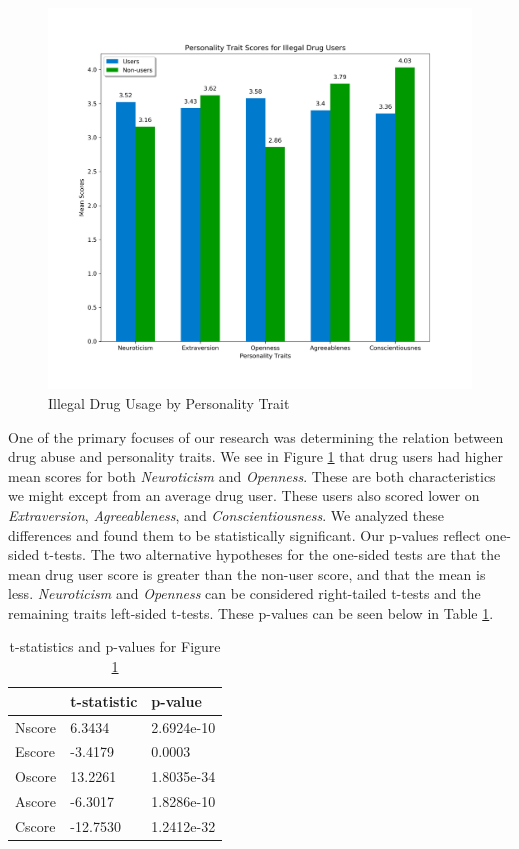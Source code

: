 \documentclass[10pt]{article}
\begin{document}
\begin{figure}[H]
\caption{Illegal Drug Usage by Personality Trait}
\label{fig:traits}
\centering
\includegraphics[scale=0.22]{traits.png}
\end{figure}

One of the primary focuses of our research was determining the relation between drug abuse and personality traits. We see in Figure \ref{fig:traits} that drug users had higher mean scores for both \textit{Neuroticism} and \textit{Openness}. These are both characteristics we might except from an average drug user. These users also scored lower on \textit{Extraversion}, \textit{Agreeableness}, and \textit{Conscientiousness}. We analyzed these differences and found them to be statistically significant. Our p-values reflect one-sided t-tests. The two alternative hypotheses for the one-sided tests are that the mean drug user score is greater than the non-user score, and that the mean is less. \textit{Neuroticism} and \textit{Openness} can be considered right-tailed t-tests and the remaining traits left-sided t-tests. These p-values can be seen below in Table \ref{fig:pvalues}.

\begin{table}[H]
\centering
\caption{t-statistics and p-values for Figure \ref{fig:traits}}
\label{fig:pvalues}
\begin{tabular}{|l|l|l|}
\hline
       & t-statistic         & p-value\\ \hline
Nscore & 6.3434   & 2.6924e-10  \\ \hline
Escore & -3.4179  & 0.0003  \\ \hline
Oscore & 13.2261  & 1.8035e-34 \\ \hline
Ascore & -6.3017  & 1.8286e-10 \\ \hline
Cscore & -12.7530 & 1.2412e-32 \\ \hline
\end{tabular}
\end{table}
\end{document}
